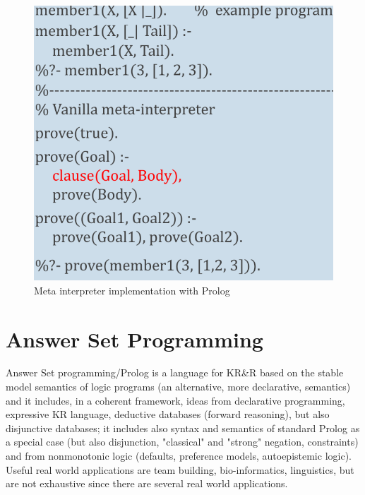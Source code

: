 \begin{figure}
	\includegraphics[width=\textwidth]{Images/metaInterpreter}
	\caption{Meta interpreter implementation with Prolog}
	\label{img:interpreter}
\end{figure}

\section{Answer Set Programming}
Answer Set programming/Prolog is a language for KR\&R based on the stable model semantics of
logic programs (an alternative, more declarative, semantics) and it includes, in a coherent
framework, ideas from declarative programming, expressive KR language, deductive databases
(forward reasoning), but also disjunctive databases; it includes also
syntax and semantics of standard Prolog as a special case 
(but also disjunction, "classical" and "strong" negation, constraints) and from
nonmonotonic logic (defaults, preference models, autoepistemic logic).\newline
Useful real world applications are team building, bio-informatics, linguistics, but are 
not exhaustive since there are several real world applications.

